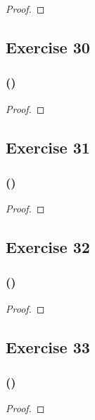 \documentclass[14pt]{extarticle}
\begin{document}
\begin{proof}

\end{proof}

\subsection{Exercise 30}

\subsubsection{()}

\begin{proof}

\end{proof}

\subsection{Exercise 31}

\subsubsection{()}

\begin{proof}

\end{proof}

\subsection{Exercise 32}

\subsubsection{()}

\begin{proof}

\end{proof}

\subsection{Exercise 33}

\subsubsection{()}

\begin{proof}

\end{proof}
\end{document}
